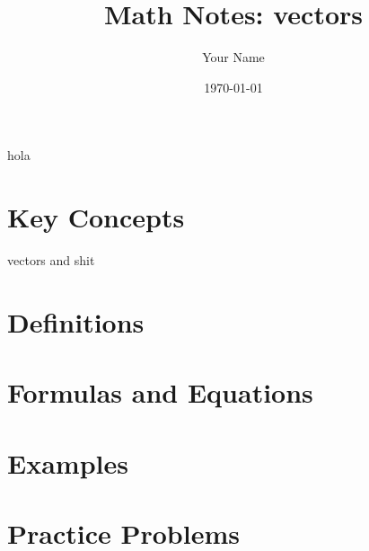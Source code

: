 \documentclass{article}
\title{Math Notes: vectors}
\author{Your Name}
\date{\today}
\begin{document}
   \maketitle
hola
   \section{Key Concepts}
   vectors and shit

   \section{Definitions}

   \section{Formulas and Equations}

   \section{Examples}

   \section{Practice Problems}

   
\end{document}

